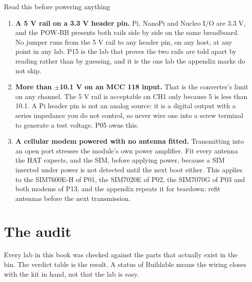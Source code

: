 \begin{rulebox}{Read this before powering anything}
\begin{enumerate}
\item \textbf{A 5 V rail on a 3.3 V header pin.} Pi, NanoPi and Nucleo I/O are 3.3 V, and the POW-BB presents both rails side by side on the same breadboard. No jumper runs from the 5 V rail to any header pin, on any host, at any point in any lab. P15 is the lab that proves the two rails are told apart by reading rather than by guessing, and it is the one lab the appendix marks do not skip.
\item \textbf{More than $\pm$10.1 V on an MCC 118 input.} That is the converter's limit on any channel. The 5 V rail is acceptable on CH1 only because 5 is less than 10.1. A Pi header pin is not an analog source: it is a digital output with a series impedance you do not control, so never wire one into a screw terminal to generate a test voltage. P05 owns this.
\item \textbf{A cellular modem powered with no antenna fitted.} Transmitting into an open port stresses the module's own power amplifier. Fit every antenna the HAT expects, and the SIM, before applying power, because a SIM inserted under power is not detected until the next boot either. This applies to the SIM7600E-H of P01, the SIM7020E of P02, the SIM7070G of P03 and both modems of P13, and the appendix repeats it for teardown: refit antennas before the next transmission.
\end{enumerate}
\end{rulebox}

\section*{The audit}

Every lab in this book was checked against the parts that actually exist in the bin. The verdict table is the result. A status of Buildable means the wiring closes with the kit in hand, not that the lab is easy.

